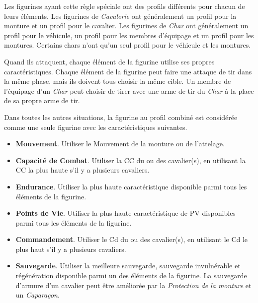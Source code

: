 Les figurines ayant cette règle spéciale ont des profils différents pour chacun de leurs éléments. Les figurines de \emph{Cavalerie} ont généralement un profil pour la monture et un profil pour le cavalier. Les figurines de \emph{Char} ont généralement un profil pour le véhicule, un profil pour les membres d'équipage et un profil pour les montures. Certains chars n'ont qu'un seul profil pour le véhicule et les montures.

Quand ils attaquent, chaque élément de la figurine utilise ses propres caractéristiques. Chaque élément de la figurine peut faire une attaque de tir dans la même phase, mais ils doivent tous choisir la même cible. Un membre de l'équipage d'un \emph{Char} peut choisir de tirer avec une arme de tir du \emph{Char} à la place de sa propre arme de tir.

Dans toutes les autres situations, la figurine au profil combiné est considérée comme une seule figurine avec les caractéristiques suivantes.

\begin{itemize}[label={-}]
\item \textbf{Mouvement}. Utiliser le Mouvement de la monture ou de l'attelage.
\item \textbf{Capacité de Combat}. Utiliser la CC du ou des cavalier(s), en utilisant la CC la plus haute s'il y a plusieurs cavaliers.
\item \textbf{Endurance}. Utiliser la plus haute caractéristique  disponible parmi tous les éléments de la figurine.
\item \textbf{Points de Vie}. Utiliser la plus haute caractéristique de PV disponibles parmi tous les éléments de la figurine.
\item \textbf{Commandement}. Utiliser le Cd du ou des cavalier(s), en utilisant le Cd le plus haut s'il y a plusieurs cavaliers.
\item \textbf{Sauvegarde}. Utiliser la meilleure sauvegarde, sauvegarde invulnérable et régénération disponible parmi un des éléments de la figurine. La sauvegarde d'armure d'un cavalier peut être améliorée par la \emph{Protection de la monture} et un \emph{Caparaçon}.
\end{itemize}


\subsubsection*{}
\label{profil_monstre_monte}


